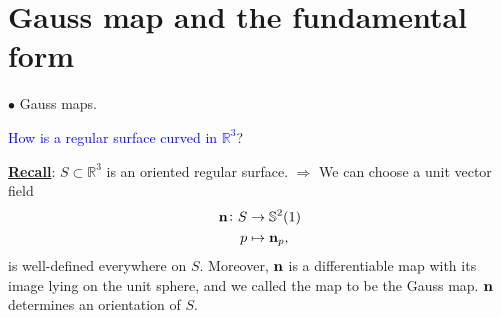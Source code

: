 \section{Gauss map and the \texorpdfstring{}{2nd} fundamental form}
\(\bullet\) Gauss maps.
\begin{question}
    \textcolor{blue}{How is a regular surface curved in \(\mathbb{R}^3\)}? 
\end{question}
\underline{\textbf{Recall}}: \(S\subset\mathbb{R}^3\) is an oriented
regular surface. 
\(\Rightarrow\) We can choose a unit vector field 
    \begin{align*}
        \vb{n}\colon S&\to \mathbb{S}^2(1)\\
        p&\mapsto \vb{n}_p,
    \end{align*}
is well-defined everywhere on \(S\). Moreover, \(\vb{n}\) is a
differentiable map with its image lying on the unit sphere, and we 
called the map to be the Gauss map. \(\vb{n}\) determines an 
orientation of \(S\).
